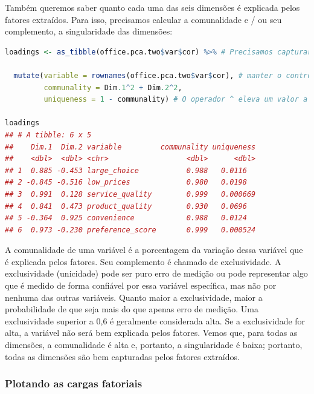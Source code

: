 \documentclass{article}
\begin{document}
Também queremos saber quanto cada uma das seis dimensões é explicada pelos fatores extraídos. Para isso, precisamos calcular a comunalidade e / ou seu complemento, a singularidade das dimensões:

\begin{lstlisting}[language=R]
loadings <- as_tibble(office.pca.two$var$cor) %>% # Precisamos capturar os carregamentos como um quadro de dados em um novo objeto. Use as_tibble(), caso contrario, nao podemos acessar os diferentes fatores

  mutate(variable = rownames(office.pca.two$var$cor), # manter o controle dos nomes das linhas (eles sao removidos ao converter para tibble)
         communality = Dim.1^2 + Dim.2^2, 
         uniqueness = 1 - communality) # O operador ^ eleva um valor a uma determinada potencia. Para calcular a comunalidade, precisamos somar os quadrados das cargas em cada fator.
         
loadings
## # A tibble: 6 x 5
##    Dim.1  Dim.2 variable         communality uniqueness
##    <dbl>  <dbl> <chr>                  <dbl>      <dbl>
## 1  0.885 -0.453 large_choice           0.988   0.0116  
## 2 -0.845 -0.516 low_prices             0.980   0.0198  
## 3  0.991  0.128 service_quality        0.999   0.000669
## 4  0.841  0.473 product_quality        0.930   0.0696  
## 5 -0.364  0.925 convenience            0.988   0.0124  
## 6  0.973 -0.230 preference_score       0.999   0.000524
\end{lstlisting}

A comunalidade de uma variável é a porcentagem da variação dessa variável que é explicada pelos fatores. Seu complemento é chamado de exclusividade. A exclusividade (unicidade) pode ser puro erro de medição ou pode representar algo que é medido de forma confiável por essa variável específica, mas não por nenhuma das outras variáveis. Quanto maior a exclusividade, maior a probabilidade de que seja mais do que apenas erro de medição. Uma exclusividade superior a 0,6 é geralmente considerada alta. Se a exclusividade for alta, a variável não será bem explicada pelos fatores. Vemos que, para todas as dimensões, a comunalidade é alta e, portanto, a singularidade é baixa; portanto, todas as dimensões são bem capturadas pelos fatores extraídos.

\subsubsection{Plotando as cargas fatoriais}
\end{document}
